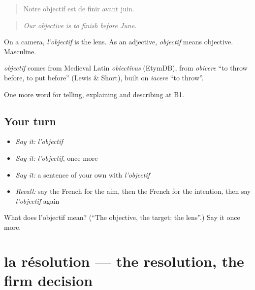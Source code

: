 \begin{quote}
Notre objectif est de finir avant juin.
\end{quote}

\begin{quote}
\emph{Our objective is to finish before June.}
\end{quote}

On a camera, \emph{l'objectif} is the lens. As an adjective, \emph{objectif} means objective. Masculine.

\begin{cousinweb}
\emph{objectif} comes from Medieval Latin \emph{obiectīvus} (EtymDB), from \emph{obicere} \textquotedblleft{}to throw before, to put before\textquotedblright{} (Lewis \& Short), built on \emph{iacere} \textquotedblleft{}to throw\textquotedblright{}.
\end{cousinweb}

\begin{grammarlens}[title={What you've built}]
One more word for telling, explaining and describing at B1.
\end{grammarlens}

\subsection*{Your turn}
\begin{itemize}
\raggedright
  \item \emph{Say it:} \emph{l'objectif}
  \item \emph{Say it:} \emph{l'objectif}, once more
  \item \emph{Say it:} a sentence of your own with \emph{l'objectif}
  \item \emph{Recall:} say the French for the aim, then the French for the intention, then say \emph{l'objectif} again
\end{itemize}

\begin{tcolorbox}[breakable,colback=teal!4,colframe=teal!35!black,title={Before you move on}]
What does l'objectif mean? (\textquotedblleft{}The objective, the target; the lens\textquotedblright{}.) Say it once more.
\end{tcolorbox}
\section[la résolution]{la résolution — the resolution, the firm decision}

\label{lesson:FR-C374-resolution}



